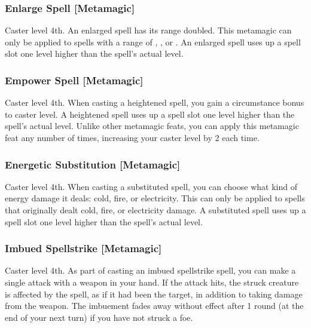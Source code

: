 \subsubsection{Enlarge Spell [Metamagic]}
 Caster level 4th.
 An enlarged spell has its range doubled. This metamagic can only be applied to spells with a range of \rngclose, \rngmed, or \rnglong. An enlarged spell uses up a spell slot one level higher than the spell's actual level.

\begin{comment}
\subsubsection{Extend Spell [Metamagic]}
\parhead{Prerequisite} Caster level 8th.
\parhead{Benefit} An extended spell has its duration increased by one duration category: from Short, to Medium, to Long, to Extreme. This metamagic can only be applied to spells with a duration of \durshort, \durmed, or \durlong. An extended spell uses up a spell slot three levels higher than the spell's actual level.
\end{comment}

\subsubsection{Empower Spell [Metamagic]}
 Caster level 4th.
 When casting a heightened spell, you gain a  circumstance bonus to caster level. A heightened spell uses up a spell slot one level higher than the spell's actual level. Unlike other metamagic feats, you can apply this metamagic feat any number of times, increasing your caster level by 2 each time.

\subsubsection{Energetic Substitution [Metamagic]}
 Caster level 4th.
 When casting a substituted spell, you can choose what kind of energy damage it deals: cold, fire, or electricity. This can only be applied to spells that originally dealt cold, fire, or electricity damage. A substituted spell uses up a spell slot one level higher than the spell's actual level.

\subsubsection{Imbued Spellstrike [Metamagic]}
 Caster level 4th.
 As part of casting an imbued spellstrike spell, you can make a single attack with a weapon in your hand. If the attack hits, the struck creature is affected by the spell, as if it had been the target, in addition to taking damage from the weapon. The imbuement fades away without effect after 1 round (at the end of your next turn) if you have not struck a foe.

